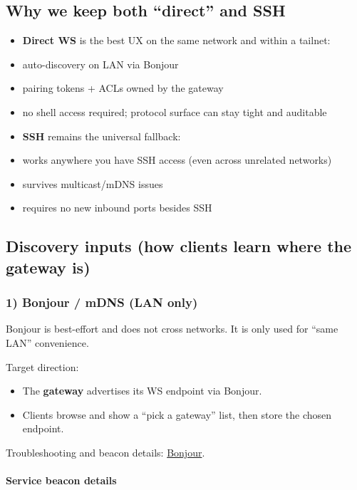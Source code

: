 \subsection{Why we keep both “direct” and SSH}


\begin{itemize}
  \item \textbf{Direct WS} is the best UX on the same network and within a tailnet:
  \item auto-discovery on LAN via Bonjour
  \item pairing tokens + ACLs owned by the gateway
  \item no shell access required; protocol surface can stay tight and auditable
  \item \textbf{SSH} remains the universal fallback:
  \item works anywhere you have SSH access (even across unrelated networks)
  \item survives multicast/mDNS issues
  \item requires no new inbound ports besides SSH
\end{itemize}


\subsection{Discovery inputs (how clients learn where the gateway is)}


\subsubsection{1) Bonjour / mDNS (LAN only)}


Bonjour is best-effort and does not cross networks. It is only used for “same LAN” convenience.

Target direction:

\begin{itemize}
  \item The \textbf{gateway} advertises its WS endpoint via Bonjour.
  \item Clients browse and show a “pick a gateway” list, then store the chosen endpoint.
\end{itemize}


Troubleshooting and beacon details: \href{/gateway/bonjour}{Bonjour}.

\paragraph{Service beacon details}


